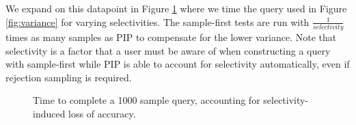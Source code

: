 We expand on this datapoint in Figure \ref{fig:scaling_selectivity} where we time the query used in Figure \ref{fig:variance} for varying selectivities.  The sample-first tests are run with $\frac{1}{selectivity}$ times as many samples as PIP to compensate for the lower variance.  Note that selectivity is a factor that a user must be aware of when constructing a query with sample-first while PIP is able to account for selectivity automatically, even if rejection sampling is required.

\begin{figure}
\begin{center}
\caption{Time to complete a 1000 sample query, accounting for selectivity-induced loss of accuracy.}
\label{fig:scaling_selectivity}
\end{center}
\end{figure}

%
%

